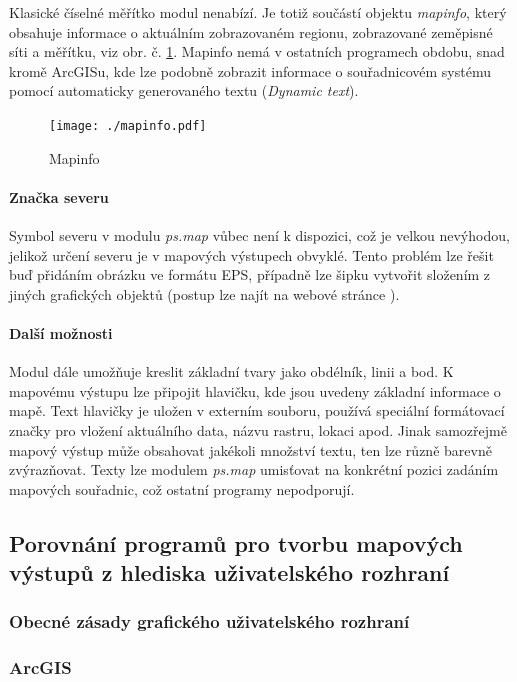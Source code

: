 \documentclass[a4paper,12pt,draft]{article}
\newcommand{\modul}[1]{\emph{#1}}
\begin{document}
Klasické číselné měřítko modul nenabízí. Je totiž součástí objektu \emph{mapinfo}, který obsahuje informace o aktuálním zobrazovaném regionu, zobrazované zeměpisné síti a měřítku, viz obr. č. \ref{fig:mapinfo}. Mapinfo nemá v ostatních programech obdobu, snad kromě ArcGISu, kde lze podobně zobrazit informace o souřadnicovém systému pomocí automaticky generovaného textu (\emph{Dynamic text}). 
\begin{figure}[h!]
    \centering
    \texttt{[image: ./mapinfo.pdf]}
    \caption{Mapinfo}
    \label{fig:mapinfo}
\end{figure}

\paragraph*{Značka severu}
Symbol severu v modulu \modul{ps.map} vůbec není k dispozici, což je velkou nevýhodou, jelikož určení severu je v mapových výstupech obvyklé. Tento problém lze řešit buď přidáním obrázku ve formátu EPS, případně lze šipku vytvořit složením z jiných grafických objektů (postup lze najít na webové stránce \cite{wiki_psmap_north}).

\paragraph*{Další možnosti}
Modul dále umožňuje kreslit základní tvary jako obdélník, linii a bod. K mapovému výstupu lze připojit hlavičku, kde jsou uvedeny základní informace o mapě. Text hlavičky je uložen v externím souboru, používá speciální formátovací značky pro vložení aktuálního data, názvu rastru, lokaci apod. Jinak samozřejmě mapový výstup může obsahovat jakékoli množství textu, ten lze různě barevně zvýrazňovat. Texty lze modulem \modul{ps.map} umisťovat na konkrétní pozici zadáním mapových souřadnic, což ostatní programy nepodporují. 

\subsection{Porovnání programů pro tvorbu mapových výstupů z hlediska uživatelského rozhraní }
\subsubsection{Obecné zásady grafického uživatelského rozhraní}
\subsubsection{ArcGIS}
\end{document}
